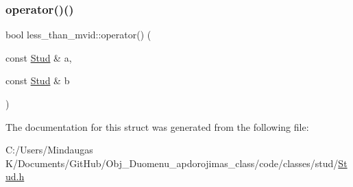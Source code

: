 \subsubsection{\texorpdfstring{operator()()}{operator()()}\hspace{0.1cm}{\footnotesize\ttfamily [2/2]}}
{\footnotesize\ttfamily bool less\+\_\+than\+\_\+mvid\+::operator() (\begin{DoxyParamCaption}\item[{const \mbox{\hyperlink{class_stud}{Stud}} \&}]{a,  }\item[{const \mbox{\hyperlink{class_stud}{Stud}} \&}]{b }\end{DoxyParamCaption})\hspace{0.3cm}{\ttfamily [inline]}}



The documentation for this struct was generated from the following file\+:\begin{DoxyCompactItemize}
\item 
C\+:/\+Users/\+Mindaugas K/\+Documents/\+Git\+Hub/\+Obj\+\_\+\+Duomenu\+\_\+apdorojimas\+\_\+class/code/classes/stud/\mbox{\hyperlink{code_2classes_2stud_2_stud_8h}{Stud.\+h}}\end{DoxyCompactItemize}
